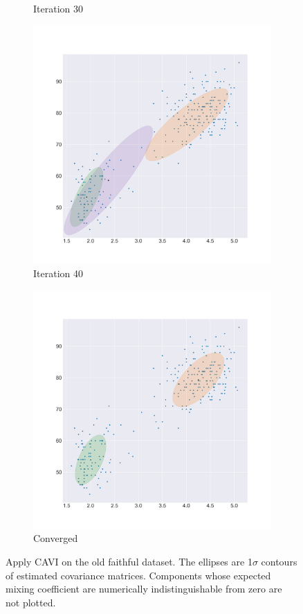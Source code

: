 \documentclass[letterpaper]{article}
\begin{document}
\begin{figure}[H]
\begin{subfigure}[b]{0.25\linewidth}
     \caption{Iteration 30}
  \end{subfigure}
  \begin{subfigure}[b]{0.25\linewidth}
    \includegraphics[width=\linewidth]{outputs/old_faithful/iter_40.png}
    \caption{Iteration 40}
  \end{subfigure}
  \begin{subfigure}[b]{0.25\linewidth}
    \includegraphics[width=\linewidth]{outputs/old_faithful/final.png}
    \caption{Converged}
  \end{subfigure}
  \caption{Apply CAVI on the old faithful dataset. The ellipses are 1$\sigma$ contours of estimated covariance matrices. Components whose expected mixing coefficient are numerically indistinguishable from zero are not plotted.}
\label{fig:old1}
\end{figure}
\end{document}
